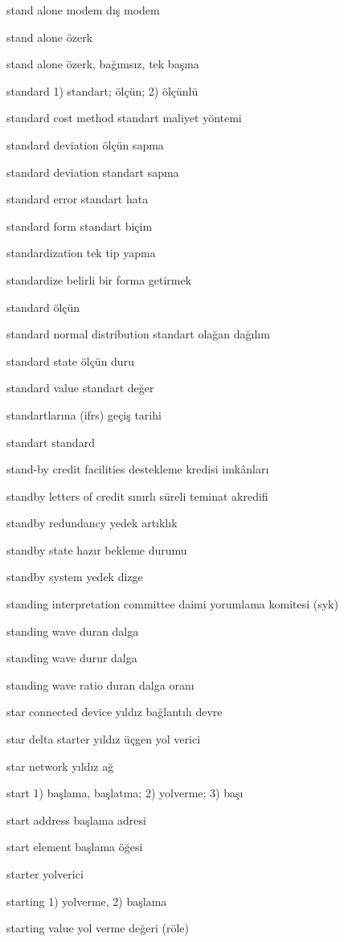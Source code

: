 \documentclass[12pt,fleqn]{article}\usepackage{../../common}
\begin{document}
stand alone modem dış modem

stand alone özerk

stand alone özerk, bağımsız, tek başına

standard 1) standart; ölçün; 2) ölçünlü

standard cost method standart maliyet yöntemi

standard deviation ölçün sapma

standard deviation standart sapma

standard error standart hata

standard form standart biçim

standardization tek tip yapma

standardize belirli bir forma getirmek

standard ölçün

standard normal distribution standart olağan dağılım

standard state ölçün duru

standard value standart değer

standartlarına (ifrs) geçiş tarihi

standart standard

stand-by credit facilities destekleme kredisi imkânları

standby letters of credit sınırlı süreli teminat akredifi

standby redundancy yedek artıklık

standby state hazır bekleme durumu

standby system yedek dizge

standing interpretation committee daimi yorumlama komitesi (syk)

standing wave duran dalga

standing wave durur dalga

standing wave ratio duran dalga oranı

star connected device yıldız bağlantılı devre

star delta starter yıldız üçgen yol verici

star network yıldız ağ

start 1) başlama, başlatma; 2) yolverme; 3) başı

start address başlama adresi

start element başlama öğesi

starter yolverici

starting 1) yolverme, 2) başlama

starting value yol verme değeri (röle)
\end{document}
